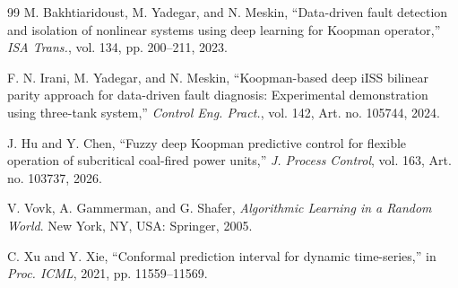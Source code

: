 \documentclass[journal]{IEEEtran}
\newcommand{\1}{\bm 1}
\begin{document}
\begin{thebibliography}{99}
M. Bakhtiaridoust, M. Yadegar, and N. Meskin, ``Data-driven fault detection
and isolation of nonlinear systems using deep learning for Koopman operator,''
\emph{ISA Trans.}, vol. 134, pp. 200--211, 2023.

F. N. Irani, M. Yadegar, and N. Meskin, ``Koopman-based deep iISS bilinear
parity approach for data-driven fault diagnosis: Experimental demonstration
using three-tank system,'' \emph{Control Eng. Pract.}, vol. 142,
Art. no. 105744, 2024.

J. Hu and Y. Chen, ``Fuzzy deep Koopman predictive control for flexible
operation of subcritical coal-fired power units,'' \emph{J. Process Control},
vol. 163, Art. no. 103737, 2026.

V. Vovk, A. Gammerman, and G. Shafer,
\emph{Algorithmic Learning in a Random World}. New York, NY, USA: Springer,
2005.

C. Xu and Y. Xie, ``Conformal prediction interval for dynamic time-series,''
in \emph{Proc. ICML}, 2021, pp. 11559--11569.
\end{thebibliography}
\end{document}
